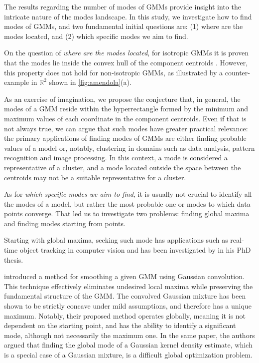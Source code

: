The results regarding the number of modes of GMMs provide insight into the intricate nature of the modes landscape. In this study, we investigate how to find modes of GMMs, and two fundamental initial questions are: (1) where are the modes located, and (2) which specific modes we aim to find.

On the question of \emph{where are the modes located}, for isotropic GMMs it is proven that the modes lie inside the convex hull of the component centroids \citep{Amendola2019}. However, this property does not hold for non-isotropic GMMs, as illustrated by a counter-example in $\mathbb{R}^2$ shown in \ref{fig:amendola}(a).

As an exercise of imagination, we propose the conjecture that, in general, the modes of a GMM reside within the hyperrectangle formed by the minimum and maximum values of each coordinate in the component centroids. Even if that is not always true, we can argue that such modes have greater practical relevance: the primary applications of finding modes of GMMs are either finding probable values of a model or, notably, clustering in domains such as data analysis, pattern recognition and image processing. In this context, a mode is considered a representative of a cluster, and a mode located outside the space between the centroids may not be a suitable representative for a cluster.

As for \emph{which specific modes we aim to find}, it is usually not crucial to identify all the modes of a model, but rather the most probable one or modes to which data points converge. That led us to investigate two problems: finding global maxima and finding modes starting from points.

\vspace{1em}

Starting with global maxima, seeking such mode has applications such as real-time object tracking in computer vision \citep{Shen2005} and has been investigated by \citet{Pulkkinen2014} in his PhD thesis.

\citet{Pulkkinen2013} introduced a method for smoothing a given GMM using Gaussian convolution. This technique effectively eliminates undesired local maxima while preserving the fundamental structure of the GMM. The convolved Gaussian mixture has been shown to be strictly concave under mild assumptions, and therefore has a unique maximum. Notably, their proposed method operates globally, meaning it is not dependent on the starting point, and has the ability to identify a significant mode, although not necessarily the maximum one. In the same paper, the authors argued that finding the global mode of a Gaussian kernel density estimate, which is a special case of a Gaussian mixture, is a difficult global optimization problem.

